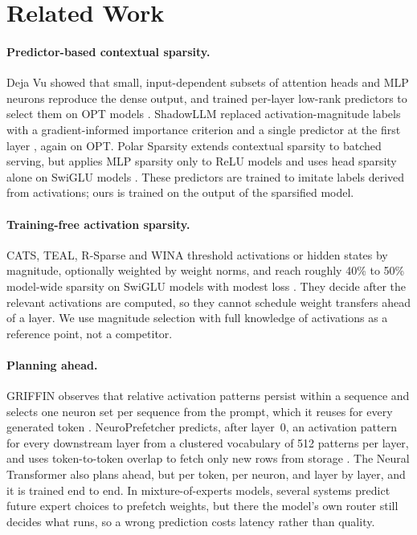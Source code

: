 \documentclass[10pt,twocolumn,letterpaper]{article}
\begin{document}
\section{Related Work}

\paragraph{Predictor-based contextual sparsity.} Deja Vu showed that small, input-dependent subsets of attention heads and MLP neurons reproduce the dense output, and trained per-layer low-rank predictors to select them on OPT models \citep{liu2023dejavu}. ShadowLLM replaced activation-magnitude labels with a gradient-informed importance criterion and a single predictor at the first layer \citep{akhauri2024shadowllm}, again on OPT. Polar Sparsity extends contextual sparsity to batched serving, but applies MLP sparsity only to ReLU models and uses head sparsity alone on SwiGLU models \citep{shrestha2025polar}. These predictors are trained to imitate labels derived from activations; ours is trained on the output of the sparsified model.

\paragraph{Training-free activation sparsity.} CATS, TEAL, R-Sparse and WINA threshold activations or hidden states by magnitude, optionally weighted by weight norms, and reach roughly 40\% to 50\% model-wide sparsity on SwiGLU models with modest loss \citep{lee2024cats,liu2025teal,zhang2025rsparse,chen2026wina}. They decide after the relevant activations are computed, so they cannot schedule weight transfers ahead of a layer. We use magnitude selection with full knowledge of activations as a reference point, not a competitor.

\paragraph{Planning ahead.} GRIFFIN observes that relative activation patterns persist within a sequence and selects one neuron set per sequence from the prompt, which it reuses for every generated token \citep{dong2024griffin}. NeuroPrefetcher predicts, after layer~0, an activation pattern for every downstream layer from a clustered vocabulary of 512 patterns per layer, and uses token-to-token overlap to fetch only new rows from storage \citep{dhar2026neuroprefetcher}. The Neural Transformer also plans ahead, but per token, per neuron, and layer by layer, and it is trained end to end. In mixture-of-experts models, several systems predict future expert choices to prefetch weights, but there the model's own router still decides what runs, so a wrong prediction costs latency rather than quality.
\end{document}
